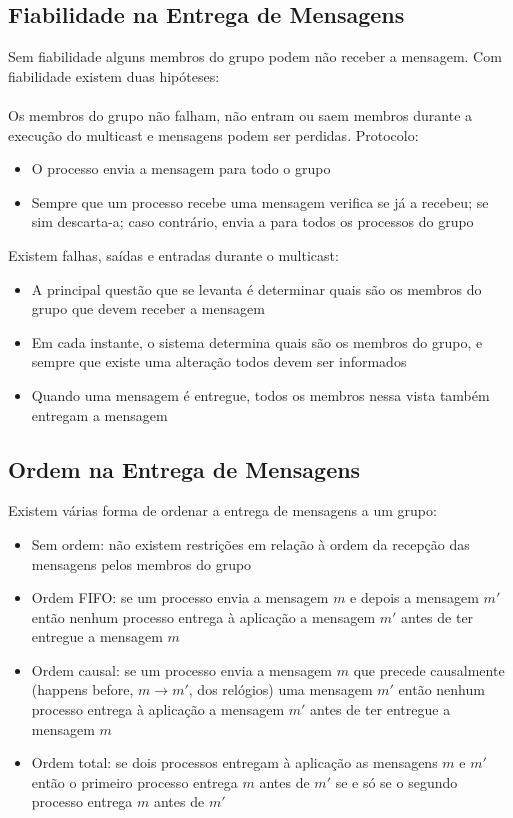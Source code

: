 \documentclass[10pt,a4paper]{report}
\begin{document}
\subsection{Fiabilidade na Entrega de Mensagens}
Sem fiabilidade alguns membros do grupo podem não receber a mensagem. Com fiabilidade existem duas hipóteses:\\
\\
Os membros do grupo não falham, não entram ou saem membros durante a execução do multicast e mensagens podem ser perdidas. Protocolo:
\begin{itemize}
\item O processo envia a mensagem para todo o grupo
\item Sempre que um processo recebe uma mensagem verifica se já a recebeu; se sim descarta-a; caso contrário, envia a para todos os processos do grupo
\end{itemize}
Existem falhas, saídas e entradas durante o multicast:
\begin{itemize}
\item A principal questão que se levanta é determinar quais são os membros do grupo que devem receber a mensagem
\item Em cada instante, o sistema determina quais são os membros do grupo, e sempre que existe uma alteração todos devem ser informados
\item Quando uma mensagem é entregue, todos os membros nessa vista também entregam a mensagem
\end{itemize}
\subsection{Ordem na Entrega de Mensagens}
Existem várias forma de ordenar a entrega de mensagens a um grupo:
\begin{itemize}
\item Sem ordem: não existem restrições em relação à ordem da recepção das mensagens pelos membros do grupo
\item Ordem FIFO: se um processo envia a mensagem $m$ e depois a mensagem $m'$ então nenhum processo entrega à aplicação a mensagem  $m'$ antes de ter entregue a mensagem $m$
\item Ordem causal: se um processo envia a mensagem $m$ que precede causalmente
(happens before, $m \rightarrow m'$, dos relógios) uma mensagem $m'$ então nenhum processo entrega à aplicação a mensagem $m'$ antes de ter entregue a mensagem $m$
\item Ordem total: se dois processos entregam à aplicação as mensagens $m$ e $m'$
então o primeiro processo entrega $m$ antes de $m'$ se e só se o segundo processo
entrega $m$ antes de $m'$
\end{itemize}
\end{document}
